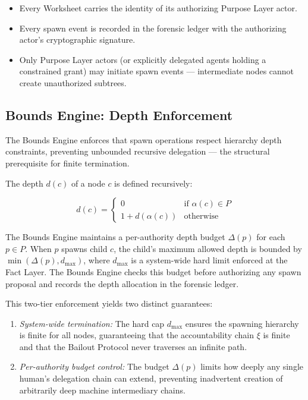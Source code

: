 \begin{itemize}
    \itemsep0em
    \item Every Worksheet carries the identity of its authorizing Purpose Layer actor.
    \item Every spawn event is recorded in the forensic ledger with the authorizing actor's cryptographic signature.
    \item Only Purpose Layer actors (or explicitly delegated agents holding a constrained grant) may initiate spawn events — intermediate nodes cannot create unauthorized subtrees.
\end{itemize}

\subsection{Bounds Engine: Depth Enforcement}
\label{sec:bounds-depth}

The Bounds Engine enforces that spawn operations respect hierarchy depth constraints, preventing unbounded recursive delegation — the structural prerequisite for finite termination.

The depth $d(c)$ of a node $c$ is defined recursively:

\begin{equation}
d(c) = \begin{cases}
0 & \text{if } \alpha(c) \in P \\
1 + d(\alpha(c)) & \text{otherwise}
\end{cases}
\tag{2}
\end{equation}

The Bounds Engine maintains a per-authority depth budget $\Delta(p)$ for each $p \in P$. When $p$ spawns child $c$, the child's maximum allowed depth is bounded by $\min(\Delta(p), d_{\max})$, where $d_{\max}$ is a system-wide hard limit enforced at the Fact Layer. The Bounds Engine checks this budget before authorizing any spawn proposal and records the depth allocation in the forensic ledger.

This two-tier enforcement yields two distinct guarantees:

\begin{enumerate}
    \itemsep0em
    \item \textit{System-wide termination:} The hard cap $d_{\max}$ ensures the spawning hierarchy is finite for all nodes, guaranteeing that the accountability chain $\xi$ is finite and that the Bailout Protocol never traverses an infinite path.
    \item \textit{Per-authority budget control:} The budget $\Delta(p)$ limits how deeply any single human's delegation chain can extend, preventing inadvertent creation of arbitrarily deep machine intermediary chains.
\end{enumerate}

